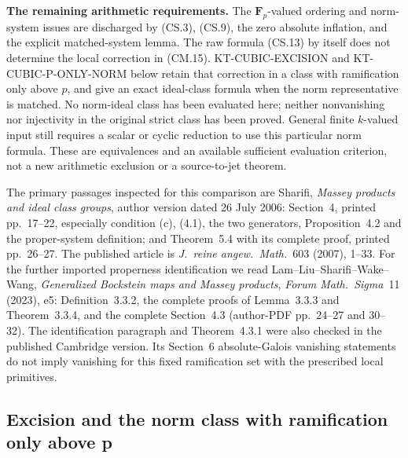 \documentclass[11pt,a4paper]{article}
\theoremstyle{definition}
\renewcommand{\paragraph}[1]{\par\smallskip\noindent\textbf{#1}\quad\ignorespaces}
\begin{document}
\paragraph{The remaining arithmetic requirements.}
The \(\mathbf F_p\)-valued ordering and norm-system
issues are discharged by (CS.3), (CS.9), the zero
absolute inflation, and the explicit matched-system
lemma.  The raw formula (CS.13) by itself does not
determine the local correction in (CM.15).
KT-CUBIC-EXCISION and KT-CUBIC-P-ONLY-NORM below
retain that correction in a class with ramification
only above \(p\), and give an exact ideal-class
formula when the norm representative is matched.
No norm-ideal class has been evaluated here;
neither nonvanishing nor injectivity in the
original strict class has been proved.
General finite \(k\)-valued input still
requires a scalar or cyclic reduction to use this
particular norm formula.  These are equivalences
and an available sufficient evaluation criterion,
not a new arithmetic exclusion or a source-to-jet
theorem.

The primary passages inspected for this comparison are
Sharifi, \emph{Massey products and ideal class groups},
author version dated 26 July 2006: Section~4, printed
pp.~17--22, especially condition (c), (4.1), the two
generators, Proposition~4.2 and the proper-system
definition; and Theorem~5.4 with its complete proof,
printed pp.~26--27.  The published article is
\emph{J.~reine angew.~Math.}~603 (2007), 1--33.
For the further imported properness identification
we read Lam--Liu--Sharifi--Wake--Wang,
\emph{Generalized Bockstein maps and Massey products},
\emph{Forum Math.~Sigma}~11 (2023), e5:
Definition~3.3.2, the complete proofs of
Lemma~3.3.3 and Theorem~3.3.4, and the complete
Section~4.3 (author-PDF pp.~24--27 and 30--32).
The identification paragraph and Theorem~4.3.1
were also checked in the published Cambridge
version.  Its Section~6 absolute-Galois vanishing
statements do not imply vanishing for this fixed
ramification set with the prescribed local
primitives.



\subsection{Excision and the norm class with ramification only above p}
\label{sec:kt-cubic-excision-norm}
\end{document}

